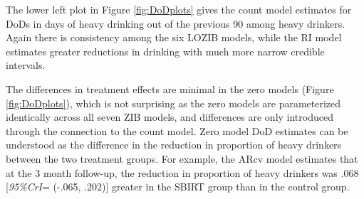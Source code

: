 \documentclass[12pt]{article}
\begin{document}
The lower left plot in Figure \ref{fig:DoDplots} gives the count model estimates for DoDs in days of heavy drinking out of the previous 90 among heavy drinkers. Again there is consistency among the six LOZIB models, while the RI model estimates greater reductions in drinking with much more narrow credible intervals.

The differences in treatment effects are minimal in the zero models (Figure \ref{fig:DoDplots}), which is not surprising as the zero models are parameterized identically across all seven ZIB models, and differences are only introduced through the connection to the count model. Zero model DoD estimates can be understood as the difference in the reduction in proportion of heavy drinkers between the two treatment groups. For example, the ARcv model estimates that at the 3 month follow-up, the reduction in proportion of heavy drinkers was .068 [\textit{95\%CrI}= (-.065, .202)] greater in the SBIRT group than in the control group.


\end{document}
